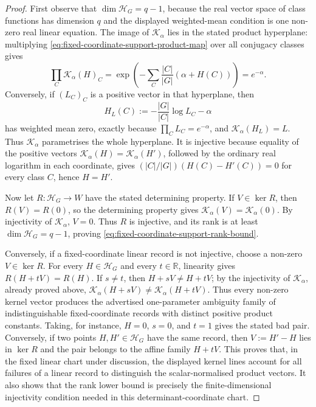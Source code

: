 \documentclass[11pt,a4paper]{amsart}
\theoremstyle{plain}
\theoremstyle{definition}
\theoremstyle{remark}
\newcommand{\RR}{\mathbb{R}}
\begin{document}
\begin{proof}
  First observe that \(\dim\mathcal H_G=q-1\), because the real vector space
  of class functions has dimension \(q\) and the displayed weighted-mean
  condition is one non-zero real linear equation.  The image of
  \(\mathcal K_\alpha\) lies in the stated product hyperplane: multiplying
  \eqref{eq:fixed-coordinate-support-product-map} over all conjugacy classes gives
  \[
    \prod_C\mathcal K_\alpha(H)_C
    =
    \exp\!\left(-\sum_C\frac{|C|}{|G|}(\alpha+H(C))\right)
    =e^{-\alpha}.
  \]
  Conversely, if \((L_C)_C\) is a positive vector in that hyperplane, then
  \[
    H_L(C):=-\frac{|G|}{|C|}\log L_C-\alpha
  \]
  has weighted mean zero, exactly because \(\prod_C L_C=e^{-\alpha}\), and
  \(\mathcal K_\alpha(H_L)=L\).  Thus \(\mathcal K_\alpha\) parametrises the
  whole hyperplane.  It is injective because equality of the positive
  vectors \(\mathcal K_\alpha(H)=\mathcal K_\alpha(H')\), followed by the
  ordinary real logarithm in each coordinate, gives
  \((|C|/|G|)(H(C)-H'(C))=0\) for every class \(C\), hence \(H=H'\).

  Now let \(R:\mathcal H_G\to W\) have the stated determining property.  If
  \(V\in\ker R\), then \(R(V)=R(0)\), so the determining property gives
  \(\mathcal K_\alpha(V)=\mathcal K_\alpha(0)\).  By injectivity of
  \(\mathcal K_\alpha\), \(V=0\).  Thus \(R\) is injective, and its rank is at
  least \(\dim\mathcal H_G=q-1\), proving
  \eqref{eq:fixed-coordinate-support-rank-bound}.

  Conversely, if a fixed-coordinate linear record is not injective, choose a
  non-zero \(V\in\ker R\).  For every \(H\in\mathcal H_G\) and every
  \(t\in\RR\), linearity gives \(R(H+tV)=R(H)\).  If
  \(s\ne t\), then \(H+sV\ne H+tV\); by the injectivity of
  \(\mathcal K_\alpha\), already proved above,
  \(\mathcal K_\alpha(H+sV)\ne\mathcal K_\alpha(H+tV)\).  Thus every non-zero
  kernel vector produces the advertised one-parameter ambiguity family of
  indistinguishable fixed-coordinate records with distinct positive product
  constants.  Taking, for instance, \(H=0\), \(s=0\), and \(t=1\) gives the
  stated bad pair.  Conversely, if two points \(H,H'\in\mathcal H_G\) have the
  same record, then \(V:=H'-H\) lies in \(\ker R\) and the pair belongs to the
  affine family \(H+tV\).  This proves that, in the fixed linear chart under
  discussion, the displayed kernel lines account for all failures of a linear
  record to distinguish the scalar-normalised product vectors.  It also shows
  that the rank lower bound is precisely the finite-dimensional injectivity
  condition needed in this determinant-coordinate chart.


\end{proof}
\end{document}
